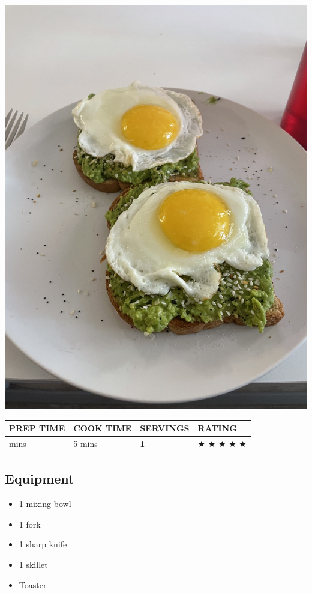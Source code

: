 \documentclass[
]{book}
\providecommand{\tightlist}{%
  \setlength{\itemsep}{0pt}\setlength{\parskip}{0pt}}
\begin{document}
\includegraphics{atwe.jpg}

\begin{longtable}[]{@{}llll@{}}
\toprule\noalign{}
\textbf{PREP TIME} & \textbf{COOK TIME} & \textbf{SERVINGS} &
\textbf{RATING} \\
\midrule\noalign{}
\endhead
\bottomrule\noalign{}
\endlastfoot
5 mins & 5 mins & \textbf{1} & ★ ★ ★ ★ ★ \\
\end{longtable}

\subsection*{Equipment}\label{equipment}

\begin{itemize}
\tightlist
\item
  1 mixing bowl
\item
  1 fork
\item
  1 sharp knife
\item
  1 skillet
\item
  Toaster
\end{itemize}
\end{document}
